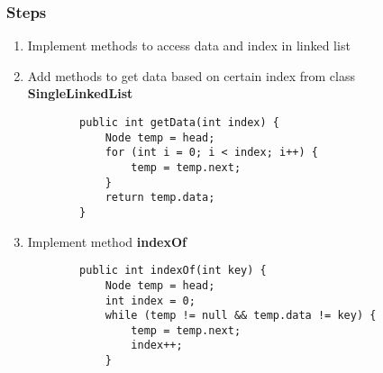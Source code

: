 \documentclass[12pt,titlepage]{article}
\begin{document}
\subsubsection{Steps}
\begin{enumerate}
    \item Implement methods to access data and index in linked list
    \item Add methods to get data based on certain index from class \textbf{SingleLinkedList}
    \begin{verbatim}
        public int getData(int index) {
            Node temp = head;
            for (int i = 0; i < index; i++) {
                temp = temp.next;
            }
            return temp.data;
        }
    \end{verbatim}
    \item Implement method \textbf{indexOf}
    \begin{verbatim}
        public int indexOf(int key) {
            Node temp = head;
            int index = 0;
            while (temp != null && temp.data != key) {
                temp = temp.next;
                index++;
            }


\end{verbatim}
\end{enumerate}
\end{document}
